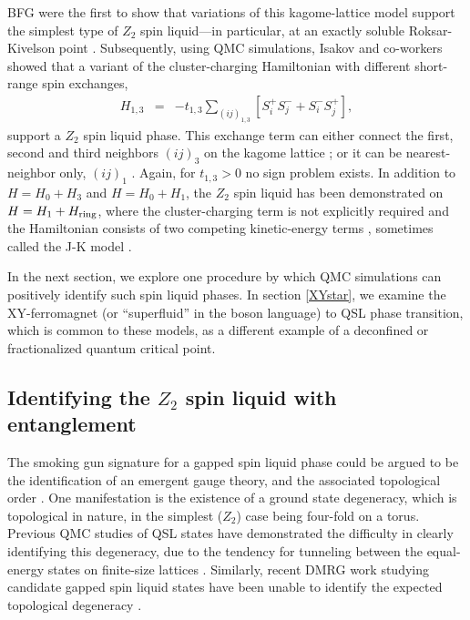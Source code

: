 \documentclass[10pt,pre,aps,twocolumn,showpacs,superscriptaddress,floatfix]{revtex4-1}
\begin{document}
BFG \cite{BFG} were the first to show that variations of this kagome-lattice model support the simplest type of $Z_2$ spin liquid---in particular, at an exactly soluble Roksar-Kivelson point \cite{Rokhsar88}.  Subsequently, using QMC simulations, Isakov and co-workers showed that a variant of the cluster-charging Hamiltonian with different short-range spin exchanges, 
\begin{eqnarray}
H_{1,3} &=& -t_{1,3} \sum_{( ij )_{1,3}} [S^{+}_i S^-_j + S^-_i S^{+}_j],  
\end{eqnarray}
support a $Z_2$ spin liquid phase.  This exchange term can either connect the first, second and third neighbors $( ij )_3$ on the kagome lattice \cite{Isakov1,Isakov2}; or it can be nearest-neighbor only, $(ij)_1$ \cite{TopoEE}.  Again, for $t_{1,3}>0$ no sign problem exists. 
In addition to  $H = H_0 + H_3$ and $H = H_0 + H_1$, the $Z_2$ spin liquid has been demonstrated on $H = H_1 + H_{\rm ring}$, where the cluster-charging term is not explicitly required and the Hamiltonian consists of two competing kinetic-energy terms \cite{Long}, sometimes called the J-K model \cite{JKqmc}.

In the next section, we explore one procedure by which QMC simulations can positively identify such spin liquid phases.  In section \ref{XYstar}, we examine the XY-ferromagnet (or ``superfluid'' in the boson language) to QSL phase transition, which is common to these models, as a different example of a deconfined or fractionalized quantum critical point.

\subsection{Identifying the $Z_2$ spin liquid with entanglement} 
\label{topoEEsec}

The smoking gun signature for a gapped spin liquid phase could be argued to be the identification of an emergent gauge theory,
and the associated topological order \cite{Wenbook}.  One manifestation is the existence of a ground state degeneracy, which is topological in nature, in the simplest ($Z_2$) case being four-fold on a torus.  Previous QMC studies of QSL states have demonstrated the difficulty in clearly identifying this degeneracy, due to the tendency for tunneling between the equal-energy states on finite-size lattices \cite{Isakov1}.  Similarly, recent DMRG work studying candidate gapped spin liquid states have been unable to identify the expected topological degeneracy \cite{Yan,J1J2}.
\end{document}
